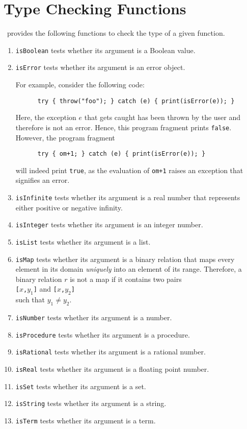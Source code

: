 \section{Type Checking Functions}
\setlx\ provides the following functions to check the type of a given function.
\begin{enumerate}
\item \texttt{isBoolean} tests whether its argument is a Boolean value.
\item \texttt{isError} tests whether its argument is an error object.

      For example, consider the following code:
      \begin{verbatim}
      try { throw("foo"); } catch (e) { print(isError(e)); }
      \end{verbatim}
      \vspace*{-0.5cm}

      Here, the exception $e$ that gets caught has been thrown by the user and therefore
      is not an error.  Hence, this program fragment prints \texttt{false}.
      However, the program fragment
      \begin{verbatim}
      try { om+1; } catch (e) { print(isError(e)); }
      \end{verbatim}
      \vspace*{-0.5cm}

      will indeed print \texttt{true}, as the evaluation of \texttt{om+1}
      raises an exception that signifies an error.
\item \texttt{isInfinite} tests whether its argument is a real number that represents
      either positive or negative infinity.
\item \texttt{isInteger} tests whether its argument is an integer number.
\item \texttt{isList} tests whether its argument is a list.
\item \texttt{isMap} tests whether its argument is a binary relation that maps every
      element in its domain \emph{uniquely} into an element of its range.  Therefore, a
      binary relation $r$ is not a map if it contains two pairs
      \\[0.2cm]
      \hspace*{1.3cm}
      \texttt{[$x$,$y_1$]} \quad and \texttt{[$x$,$y_2$]}
      \\[0.2cm]
      such that $y_1 \not= y_2$.
\item \texttt{isNumber} tests whether its argument is a number.
\item \texttt{isProcedure} tests whether its argument is a procedure.
\item \texttt{isRational} tests whether its argument is a rational number.
\item \texttt{isReal} tests whether its argument is a floating point number.
\item \texttt{isSet} tests whether its argument is a set.
\item \texttt{isString} tests whether its argument is a string.
\item \texttt{isTerm} tests whether its argument is a term.
\end{enumerate}

